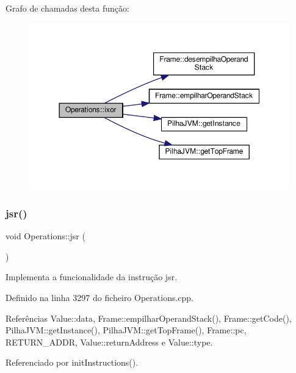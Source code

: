 Grafo de chamadas desta função\+:\nopagebreak
\begin{figure}[H]
\begin{center}
\leavevmode
\includegraphics[width=350pt]{classOperations_abd0ce3453623b677de3af1f05bcf4b0b_cgraph}
\end{center}
\end{figure}
\mbox{\label{classOperations_a63c3ab8fef60a8a19ee336cb3d86f9aa}} 
\subsubsection{\texorpdfstring{jsr()}{jsr()}}
{\footnotesize\ttfamily void Operations\+::jsr (\begin{DoxyParamCaption}{ }\end{DoxyParamCaption})\hspace{0.3cm}{\ttfamily [private]}}



Implementa a funcionalidade da instrução jsr. 



Definido na linha 3297 do ficheiro Operations.\+cpp.



Referências Value\+::data, Frame\+::empilhar\+Operand\+Stack(), Frame\+::get\+Code(), Pilha\+J\+V\+M\+::get\+Instance(), Pilha\+J\+V\+M\+::get\+Top\+Frame(), Frame\+::pc, R\+E\+T\+U\+R\+N\+\_\+\+A\+D\+DR, Value\+::return\+Address e Value\+::type.



Referenciado por init\+Instructions().

